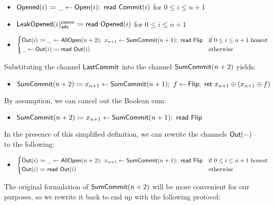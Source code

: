 \begin{itemize}
\item {\color{red} $\mathsf{Opened}(i) \coloneqq \_ \leftarrow \mathsf{Open}(i); \ \mathsf{read} \ \mathsf{Commit}(i)$ for $0 \leq i \leq n+1$}
\item {\color{red} $\mathsf{LeakOpened}(i)^{\mathsf{comm}}_{\mathsf{adv}} \coloneqq \mathsf{read} \ \mathsf{Opened}(i)$ for $0 \leq i \leq n+1$}
\item $\begin{cases*} \Out(i) \coloneqq \_ \leftarrow \AllOpen(n+2); \ x_{n+1} \leftarrow \SumCommit(n+1); \ \read{\Flip} & \text{if $0 \leq i \leq n+1$ honest} \\ \_ \leftarrow \Out(i) \coloneqq \read{\Out(i)} & \text{otherwise} \end{cases*}$
\end{itemize}

\noindent Substituting the channel $\mathsf{LastCommit}$ into the channel $\mathsf{SumCommit}(n+2)$ yields:

\begin{itemize}
\item $\mathsf{SumCommit}(n+2) \coloneqq x_{n+1} \leftarrow \mathsf{SumCommit}(n+1); \ f \leftarrow \mathsf{Flip}; \ \mathsf{ret} \ x_{n+1} \oplus (x_{n+1} \oplus f)$
\end{itemize}

\noindent By assumption, we can cancel out the Boolean sum:

\begin{itemize}
\item $\mathsf{SumCommit}(n+2) \coloneqq x_{n+1} \leftarrow \mathsf{SumCommit}(n+1);
\ \mathsf{read} \ \mathsf{Flip}$
\end{itemize}

\noindent In the presence of this simplified definition, we can rewrite the channels $\mathsf{Out}(-)$ to the following:

\begin{itemize}
\item $\begin{cases*} \Out(i) \coloneqq \_ \leftarrow \AllOpen(n+2); \ x_{n+1} \leftarrow \SumCommit(n+1); \ \read{\Flip} & \text{if $0 \leq i \leq n+1$ honest} \\ \Out(i) \coloneqq \read{\Out(i)} & \text{otherwise} \end{cases*}$
\end{itemize}

\noindent The original formulation of $\mathsf{SumCommit}(n+2)$ will be more convenient for our purposes, so we rewrite it back to end up with the following protocol:

